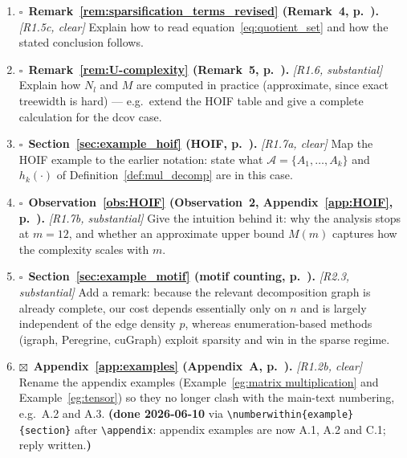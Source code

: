 \documentclass[11pt]{article}
\newcommand{\bx}{$\square$\ }   %
\newcommand{\at}[1]{\textbf{#1}} %
\begin{document}
\begin{enumerate}[label=\arabic*., leftmargin=*, itemsep=0.45em]
\item \bx \at{Remark~\ref{rem:sparsification_terms_revised} (Remark~4, p.~\pageref{rem:sparsification_terms_revised}).}
\emph{[R1.5c, clear]} Explain how to read equation~\eqref{eq:quotient_set} and how the
stated conclusion follows.

\item \bx \at{Remark~\ref{rem:U-complexity} (Remark~5, p.~\pageref{rem:U-complexity}).}
\emph{[R1.6, substantial]} Explain how $N_l$ and $M$ are computed in practice
(approximate, since exact treewidth is hard) --- e.g.\ extend the HOIF table and give a
complete calculation for the dcov case.

\item \bx \at{Section~\ref{sec:example_hoif} (HOIF, p.~\pageref{sec:example_hoif}).}
\emph{[R1.7a, clear]} Map the HOIF example to the earlier notation: state what
$\mathcal{A}=\{A_1,\dots,A_k\}$ and $h_k(\cdot)$ of Definition~\ref{def:mul_decomp} are
in this case.

\item \bx \at{Observation~\ref{obs:HOIF} (Observation~2, Appendix~\ref{app:HOIF}, p.~\pageref{obs:HOIF}).}
\emph{[R1.7b, substantial]} Give the intuition behind it: why the analysis stops at
$m=12$, and whether an approximate upper bound $M(m)$ captures how the complexity
scales with $m$.

\item \bx \at{Section~\ref{sec:example_motif} (motif counting, p.~\pageref{sec:example_motif}).}
\emph{[R2.3, substantial]} Add a remark: because the relevant decomposition graph is
already complete, our cost depends essentially only on $n$ and is largely independent
of the edge density $p$, whereas enumeration-based methods (igraph, Peregrine,
cuGraph) exploit sparsity and win in the sparse regime.

\item $\boxtimes$\ \at{Appendix~\ref{app:examples} (Appendix~A, p.~\pageref{app:examples}).}
\emph{[R1.2b, clear]} Rename the appendix examples (Example~\ref{eg:matrix multiplication}
and Example~\ref{eg:tensor}) so they no longer clash with the main-text numbering,
e.g.\ A.2 and A.3.
\textbf{(done 2026-06-10} via \texttt{\textbackslash numberwithin\{example\}\{section\}}
after \texttt{\textbackslash appendix}: appendix examples are now A.1, A.2 and
C.1; reply written.\textbf{)}

\end{enumerate}
\end{document}
